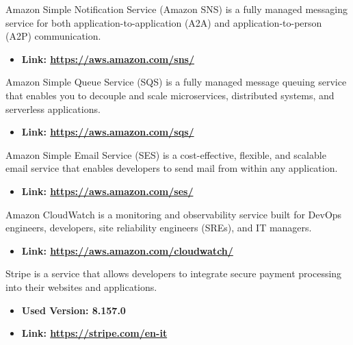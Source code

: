 Amazon Simple Notification Service (Amazon SNS) is a fully managed messaging service for both application-to-application (A2A) and application-to-person (A2P) communication.
\begin{itemize}
    \item \textbf{Link: \url{https://aws.amazon.com/sns/}}
\end{itemize}
Amazon Simple Queue Service (SQS) is a fully managed message queuing service that enables you to decouple and scale microservices, distributed systems, and serverless applications.
\begin{itemize}
    \item \textbf{Link: \url{https://aws.amazon.com/sqs/}}
\end{itemize}
Amazon Simple Email Service (SES) is a cost-effective, flexible, and scalable email service that enables developers to send mail from within any application.
\begin{itemize}
    \item \textbf{Link: \url{https://aws.amazon.com/ses/}}
\end{itemize}
Amazon CloudWatch is a monitoring and observability service built for DevOps engineers, developers, site reliability engineers (SREs), and IT managers.
\begin{itemize}
    \item \textbf{Link: \url{https://aws.amazon.com/cloudwatch/}}
\end{itemize}
Stripe is a service that allows developers to integrate secure payment processing into their websites and applications.
\begin{itemize}
    \item \textbf{Used Version: 8.157.0}
    \item \textbf{Link: \url{https://stripe.com/en-it}}
\end{itemize}
